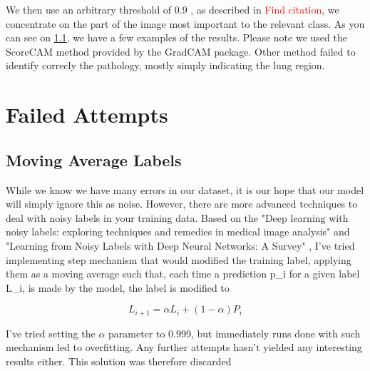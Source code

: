 \documentclass[11pt]{article}
\newcommand\myworries[1]{\textcolor{red}{#1}}
\begin{document}
        We then use an arbitrary threshold of 0.9 , as described in \myworries{Find citation}, we concentrate on the part of the image most important to the relevant class.
        As you can see on \ref{}, we have a few examples of the results. Please note we used the ScoreCAM method provided by the GradCAM package. Other method failed to
        identify correcly the pathology, mostly simply indicating the lung region.



    \section{Failed Attempts}

    \subsection{Moving Average Labels}

        While we know we have many errors in our dataset, it is our hope that our model will simply ignore this as noise. However, there are more advanced techniques
        to deal with noisy labels in your training data.
        Based on the "Deep learning with noisy labels: exploring techniques and remedies in medical image analysis" \cite{noisy_label_medical} and
        "Learning from Noisy Labels with Deep Neural Networks: A Survey" \cite{noisy_label_review}, I've tried implementing step mechanism that would modified the training
         label, applying them as a moving average such that, each time a prediction p_i for a given label L_i, is made by the model, the label is modified to

        \begin{equation}
            L_{i+1} = \alpha L_i + (1 - \alpha) P_{i}
        \end{equation}


        I've tried setting the $\alpha$ parameter to 0.999, but immediately runs done with such mechanism led to overfitting. Any further
        attempts hasn't yielded any interesting results either. This solution was therefore discarded

%
\end{document}

